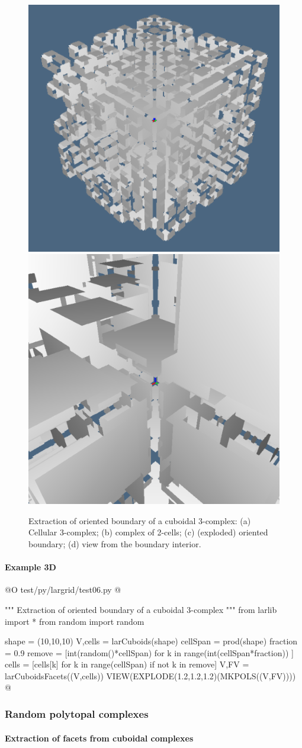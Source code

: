 \documentclass[11pt,oneside]{article}	%
\begin{document}
\begin{figure}[htbp]
   \includegraphics[height=0.245\linewidth,width=0.244\linewidth]{images/3Dsigned2} 
   \includegraphics[height=0.245\linewidth,width=0.244\linewidth]{images/3Dsigned3} 
   \caption{Extraction of oriented boundary of a cuboidal 3-complex: (a) Cellular 3-complex; (b) complex of 2-cells; (c) (exploded) oriented boundary; (d) view from the boundary interior.}
   \label{fig:2-3-complex}
\end{figure}


\paragraph{Example 3D}

@O test/py/largrid/test06.py
@{""" Extraction of oriented boundary of a cuboidal 3-complex """
from larlib import *
from random import random

shape = (10,10,10)
V,cells = larCuboids(shape)
cellSpan = prod(shape)
fraction = 0.9
remove = [int(random()*cellSpan) for k in range(int(cellSpan*fraction)) ]
cells = [cells[k] for k in range(cellSpan) if not k in remove]
V,FV = larCuboidsFacets((V,cells))
VIEW(EXPLODE(1.2,1.2,1.2)(MKPOLS((V,FV))))
@}



\subsubsection{Random polytopal complexes}


\paragraph{Extraction of facets from cuboidal complexes}
\end{document}
